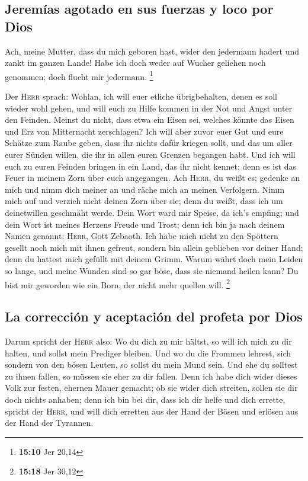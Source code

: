 \hypertarget{jeremuxedas-agotado-en-sus-fuerzas-y-loco-por-dios}{%
\subsection{Jeremías agotado en sus fuerzas y loco por
Dios}\label{jeremuxedas-agotado-en-sus-fuerzas-y-loco-por-dios}}

 Ach, meine Mutter, dass du mich geboren hast, wider den
jedermann hadert und zankt im ganzen Lande! Habe ich doch weder auf
Wucher geliehen noch genommen; doch flucht mir jedermann. \footnote{\textbf{15:10}
  Jer 20,14}

 Der \textsc{Herr} sprach: Wohlan, ich will euer etliche
übrigbehalten, denen es soll wieder wohl gehen, und will euch zu Hilfe
kommen in der Not und Angst unter den Feinden.  Meinst du
nicht, dass etwa ein Eisen sei, welches könnte das Eisen und Erz von
Mitternacht zerschlagen?  Ich will aber zuvor euer Gut
und eure Schätze zum Raube geben, dass ihr nichts dafür kriegen sollt,
und das um aller eurer Sünden willen, die ihr in allen euren Grenzen
begangen habt.  Und ich will euch zu euren Feinden
bringen in ein Land, das ihr nicht kennet; denn es ist das Feuer in
meinem Zorn über euch angegangen.  Ach \textsc{Herr}, du
weißt es; gedenke an mich und nimm dich meiner an und räche mich an
meinen Verfolgern. Nimm mich auf und verzieh nicht deinen Zorn über sie;
denn du weißt, dass ich um deinetwillen geschmäht werde. 
Dein Wort ward mir Speise, da ich's empfing; und dein Wort ist meines
Herzens Freude und Trost; denn ich bin ja nach deinem Namen genannt;
\textsc{Herr}, Gott Zebaoth.  Ich habe mich nicht zu den
Spöttern gesellt noch mich mit ihnen gefreut, sondern bin allein
geblieben vor deiner Hand; denn du hattest mich gefüllt mit deinem
Grimm.  Warum währt doch mein Leiden so lange, und meine
Wunden sind so gar böse, dass sie niemand heilen kann? Du bist mir
geworden wie ein Born, der nicht mehr quellen will. \footnote{\textbf{15:18}
  Jer 30,12}

\hypertarget{la-correcciuxf3n-y-aceptaciuxf3n-del-profeta-por-dios}{%
\subsection{La corrección y aceptación del profeta por
Dios}\label{la-correcciuxf3n-y-aceptaciuxf3n-del-profeta-por-dios}}

 Darum spricht der \textsc{Herr} also: Wo du dich zu mir
hältst, so will ich mich zu dir halten, und sollst mein Prediger
bleiben. Und wo du die Frommen lehrest, sich sondern von den bösen
Leuten, so sollst du mein Mund sein. Und ehe du solltest zu ihnen
fallen, so müssen sie eher zu dir fallen.  Denn ich habe
dich wider dieses Volk zur festen, ehernen Mauer gemacht; ob sie wider
dich streiten, sollen sie dir doch nichts anhaben; denn ich bin bei dir,
dass ich dir helfe und dich errette, spricht der \textsc{Herr},
 und will dich erretten aus der Hand der Bösen und
erlösen aus der Hand der Tyrannen.

